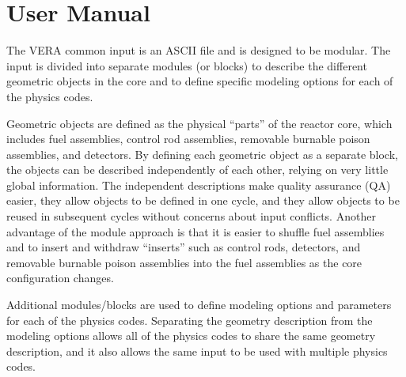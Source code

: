 \documentclass{vera-ornltm}
\begin{document}
\mainmatter



\clearpage
\section{User Manual}
\label{chap:user}

The VERA common input is an ASCII file and is designed to be modular.
The input is divided into separate modules
(or blocks) to describe the different geometric objects in the core and
to define specific modeling options for each of the physics codes.

Geometric objects are defined as the physical ``parts'' of the reactor core, which includes
fuel assemblies, control rod assemblies, removable burnable poison assemblies, and detectors.
By defining each geometric object as a separate block, the objects can be described
independently of each other, relying on very little global information. The independent
descriptions make quality assurance (QA) easier, they allow objects to be defined in one cycle,
and they allow objects to be reused in subsequent cycles without concerns about input conflicts.
Another advantage of the module approach is that it is easier to shuffle fuel assemblies
and to insert and withdraw ``inserts'' such as control rods, detectors, and removable burnable
poison assemblies into the fuel assemblies as the core configuration changes.

Additional modules/blocks are used to define modeling options and parameters for each of the physics
codes. Separating the geometry description from the modeling options allows all of the
physics codes to share the same geometry description, and it also allows the same input to be
used with multiple physics codes.
\end{document}
